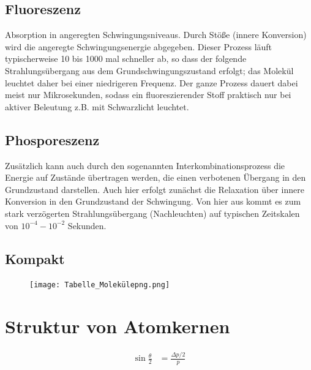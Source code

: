 \documentclass[twocolumn]{summery_4.1}
\begin{document}
\subsection{Fluoreszenz}
Absorption in angeregten Schwingungsniveaus. Durch Stöße (innere Konversion) wird die angeregte Schwingungsenergie abgegeben. Dieser Prozess läuft typischerweise 10 bis 1000 mal schneller ab, so dass der folgende Strahlungsübergang aus dem Grundschwingungszustand erfolgt; das Molekül leuchtet daher bei einer niedrigeren Frequenz. Der ganze Prozess dauert dabei meist nur Mikrosekunden, sodass ein fluoreszierender Stoff praktisch nur bei aktiver Beleutung z.B. mit Schwarzlicht leuchtet.

\subsection{Phosporeszenz}
Zusätzlich kann auch durch den sogenannten Interkombinationsprozess die Energie auf Zustände übertragen werden, die einen verbotenen Übergang in den Grundzustand darstellen. Auch hier erfolgt zunächst die Relaxation über innere Konversion in den Grundzustand der Schwingung. Von hier aus kommt es zum stark verzögerten Strahlungsübergang (Nachleuchten) auf typischen Zeitskalen von $10^{-4} - 10^{-2}$ Sekunden.
\subsection{Kompakt}
\begin{figure}[H]
    \centering
    \texttt{[image: Tabelle\_Molekülepng.png]}
\end{figure}

\section{Struktur von Atomkernen}
\begin{align*}
    \sin\frac\theta2 &= \frac{\Delta p /2}{p}
\end{align*}
\end{document}
